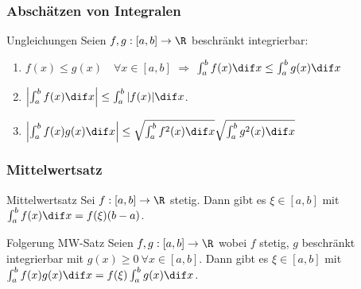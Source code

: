 \subsubsection{Abschätzen von Integralen}
\begin{corollary}{Ungleichungen}
	Seien $f,g : [a,b] \to \R$ beschränkt integrierbar: 
    \begin{enumerate}
        \item $f(x) \leq g(x) \quad \forall x \in [a,b]$ $\Rightarrow$ $\int_a^b f(x) \dif x \leq \int_a^b g(x) \dif x$
        \item $\left| \int_a^b f(x) \dif x \right| \leq \int_a^b |f(x)| \dif x$.
        \item $\left| \int_a^b f(x) g(x) \dif x \right| \leq \sqrt{\int_{a}^{b} f^2(x) \dif x} \sqrt{\int_{a}^{b} g^2(x) \dif x}$
    \end{enumerate}
\end{corollary}
\subsubsection{Mittelwertsatz}
\begin{theorem}[important]{Mittelwertsatz}
	Sei $f:[a,b] \to \R$ stetig.
	Dann gibt es $\xi \in [a,b]$ mit $\int_{a}^{b} f(x) \dif x = f(\xi)(b-a)$.
\end{theorem}
\begin{theorem}{Folgerung MW-Satz}
	Seien $f,g: [a,b] \to \R$ wobei $f$ stetig, $g$ beschränkt integrierbar mit $g(x) \geq 0~\forall x \in [a,b]$.
	Dann gibt es $\xi \in [a,b]$ mit $\int_{a}^{b} f(x)g(x) \dif x = f(\xi) \int_{a}^{b} g(x) \dif x$.
\end{theorem}


